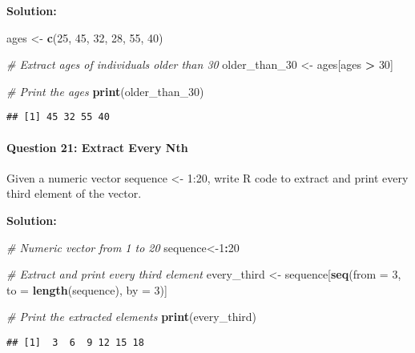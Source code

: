 \documentclass[
]{article}
\newenvironment{Shaded}{\begin{snugshade}}{\end{snugshade}}
\newcommand{\AttributeTok}[1]{\textcolor[rgb]{0.13,0.29,0.53}{#1}}
\newcommand{\CommentTok}[1]{\textcolor[rgb]{0.56,0.35,0.01}{\textit{#1}}}
\newcommand{\DecValTok}[1]{\textcolor[rgb]{0.00,0.00,0.81}{#1}}
\newcommand{\FunctionTok}[1]{\textcolor[rgb]{0.13,0.29,0.53}{\textbf{#1}}}
\newcommand{\NormalTok}[1]{#1}
\newcommand{\OtherTok}[1]{\textcolor[rgb]{0.56,0.35,0.01}{#1}}
\newcommand{\SpecialCharTok}[1]{\textcolor[rgb]{0.81,0.36,0.00}{\textbf{#1}}}
\begin{document}
\textbf{Solution:}

\begin{Shaded}
\begin{Highlighting}[]
\NormalTok{ages }\OtherTok{\textless{}{-}} \FunctionTok{c}\NormalTok{(}\DecValTok{25}\NormalTok{, }\DecValTok{45}\NormalTok{, }\DecValTok{32}\NormalTok{, }\DecValTok{28}\NormalTok{, }\DecValTok{55}\NormalTok{, }\DecValTok{40}\NormalTok{)}

\CommentTok{\# Extract ages of individuals older than 30}
\NormalTok{older\_than\_30 }\OtherTok{\textless{}{-}}\NormalTok{ ages[ages }\SpecialCharTok{\textgreater{}} \DecValTok{30}\NormalTok{]}

\CommentTok{\# Print the ages}
\FunctionTok{print}\NormalTok{(older\_than\_30)}
\end{Highlighting}
\end{Shaded}

\begin{verbatim}
## [1] 45 32 55 40
\end{verbatim}

\hypertarget{question-21-extract-every-nth}{%
\paragraph{Question 21: Extract Every
Nth}\label{question-21-extract-every-nth}}

Given a numeric vector sequence \textless- 1:20, write R code to extract
and print every third element of the vector.

\textbf{Solution:}

\begin{Shaded}
\begin{Highlighting}[]
\CommentTok{\# Numeric vector from 1 to 20}
\NormalTok{sequence}\OtherTok{\textless{}{-}}\DecValTok{1}\SpecialCharTok{:}\DecValTok{20}

\CommentTok{\# Extract and print every third element}
\NormalTok{every\_third }\OtherTok{\textless{}{-}}\NormalTok{ sequence[}\FunctionTok{seq}\NormalTok{(}\AttributeTok{from =} \DecValTok{3}\NormalTok{, }\AttributeTok{to =} \FunctionTok{length}\NormalTok{(sequence), }\AttributeTok{by =} \DecValTok{3}\NormalTok{)]}

\CommentTok{\# Print the extracted elements}
\FunctionTok{print}\NormalTok{(every\_third)}
\end{Highlighting}
\end{Shaded}

\begin{verbatim}
## [1]  3  6  9 12 15 18
\end{verbatim}
\end{document}
